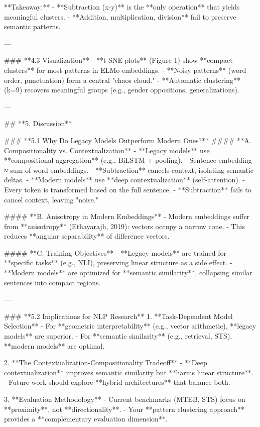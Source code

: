 **Takeaway:**
- **Subtraction (x-y)** is the **only operation** that yields meaningful clusters.
- **Addition, multiplication, division** fail to preserve semantic patterns.

---

### **4.3 Visualization**
- **t-SNE plots** (Figure 1) show **compact clusters** for most patterns in ELMo embeddings.
- **Noisy patterns** (word order, punctuation) form a central "chaos cloud."
- **Automatic clustering** (k=9) recovers meaningful groups (e.g., gender oppositions, generalizations).

---

## **5. Discussion**

### **5.1 Why Do Legacy Models Outperform Modern Ones?**
#### **A. Compositionality vs. Contextualization**
- **Legacy models** use **compositional aggregation** (e.g., BiLSTM + pooling).
  - Sentence embedding ≈ sum of word embeddings.
  - **Subtraction** cancels context, isolating semantic deltas.
- **Modern models** use **deep contextualization** (self-attention).
  - Every token is transformed based on the full sentence.
  - **Subtraction** fails to cancel context, leaving "noise."

#### **B. Anisotropy in Modern Embeddings**
- Modern embeddings suffer from **anisotropy** (Ethayarajh, 2019): vectors occupy a narrow cone.
- This reduces **angular separability** of difference vectors.

#### **C. Training Objectives**
- **Legacy models** are trained for **specific tasks** (e.g., NLI), preserving linear structure as a side effect.
- **Modern models** are optimized for **semantic similarity**, collapsing similar sentences into compact regions.

---

### **5.2 Implications for NLP Research**
1. **Task-Dependent Model Selection**
   - For **geometric interpretability** (e.g., vector arithmetic), **legacy models** are superior.
   - For **semantic similarity** (e.g., retrieval, STS), **modern models** are optimal.

2. **The Contextualization-Compositionality Tradeoff**
   - **Deep contextualization** improves semantic similarity but **harms linear structure**.
   - Future work should explore **hybrid architectures** that balance both.

3. **Evaluation Methodology**
   - Current benchmarks (MTEB, STS) focus on **proximity**, not **directionality**.
   - Your **pattern clustering approach** provides a **complementary evaluation dimension**.

